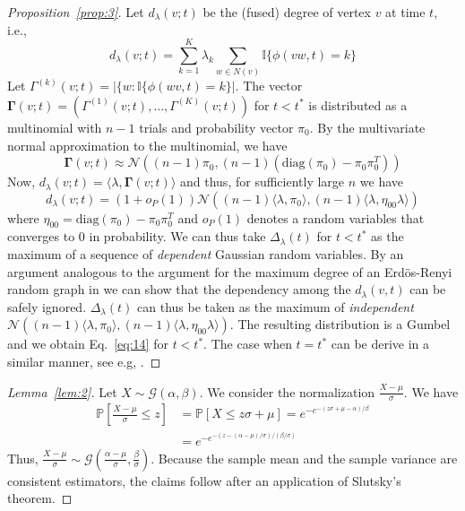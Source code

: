 \documentclass[draftcls]{IEEEtran}
\theoremstyle{definition}
\begin{document}
\begin{proof}[Proposition~\ref{prop:3}]
  Let $d_{\lambda}(v;t)$ be the (fused) degree of vertex $v$ at time
  $t$, i.e.,
  \begin{equation*}
    d_{\lambda}(v;t) = \sum_{k = 1}^{K} \lambda_k \sum_{w \in N(v)}
    \mathbb{I}\{ \phi(vw,t) = k \}
  \end{equation*}
  Let $\Gamma^{(k)}(v;t) = |\{w \colon \mathbb{I}\{\phi(wv,t) =
  k\}|$. The vector $\bm{\Gamma}(v;t) = (\Gamma^{(1)}(v;t), \dots,
  \Gamma^{(K)}(v;t))$ for $t < t^{*}$ is distributed as a multinomial
  with $n-1$ trials and probability vector $\pi_0$. By the multivariate
  normal approximation to the multinomial, we have
  \begin{equation*}
    \bm{\Gamma}(v;t) \approx \mathcal{N}((n-1)\pi_0,
    (n-1)(\mathrm{diag}(\pi_0) - \pi_0 \pi_0^{T}))
  \end{equation*}
  Now, $d_{\lambda}(v;t) = \langle \lambda, \bm{\Gamma}(v;t) \rangle$
  and thus, for sufficiently large $n$ we have
  \begin{equation*}
    d_{\lambda}(v;t) = (1 + o_P(1)) \mathcal{N}((n-1) \langle \lambda, \pi_0
    \rangle, (n-1) \langle \lambda, \eta_{00} \lambda \rangle)
  \end{equation*}
  where $\eta_{00} = \mathrm{diag}(\pi_0) - \pi_0 \pi_0^{T}$ and
  $o_P(1)$ denotes a random variables that converges to $0$ in
  probability. We can thus take $\Delta_{\lambda}(t)$ for $t < t^{*}$
  as the maximum of a sequence of {\em dependent} Gaussian random
  variables. By an argument analogous to the argument for the maximum
  degree of an Erd\"{o}s-Renyi random graph in \cite[\S
  III.1]{bollobas85:_random_graph} we can show that the dependency
  among the $d_{\lambda}(v,t)$ can be safely
  ignored. $\Delta_{\lambda}(t)$ can thus be taken as the maximum of
  {\em independent} $\mathcal{N}((n-1) \langle \lambda,
  \pi_0 \rangle, (n-1) \langle \lambda, \eta_{00} \lambda
  \rangle)$. The resulting distribution is a Gumbel \cite[\S
  2.3]{galambos87:_asymp_theor_extrem_order_statis} and we obtain
  Eq.~\eqref{eq:14} for $t < t^{*}$. The case when $t = t^{*}$ can be
  derive in a similar manner, see e.g,
  \cite{rukhin:_limit_distr_graph_scan_statis}.
\end{proof}
\begin{proof}[Lemma~\ref{lem:2}]
  Let $ X \sim \mathcal{G}(\alpha, \beta)$. We consider the
  normalization $\tfrac{X - \mu}{\sigma}$. We have
  \begin{equation*}
    \begin{split}
    \mathbb{P}[ \frac{X - \mu}{\sigma} \leq z]  &= \mathbb{P}[X \leq z
    \sigma + \mu] 
    = e^{-e^{-(z \sigma + \mu - \alpha)/\beta}} \\
      &= e^{- e^{-(z - (\alpha - \mu)/\sigma)/(\beta/\sigma)}}
    \end{split}
  \end{equation*}
  Thus, $\tfrac{X - \mu}{\sigma} \sim \mathcal{G}(\tfrac{\alpha -
    \mu}{\sigma}, \tfrac{\beta}{\sigma})$. Because the sample
  mean and the sample variance are consistent estimators, the claims
  follow after an application of Slutsky's theorem.
\end{proof}
\end{document}
